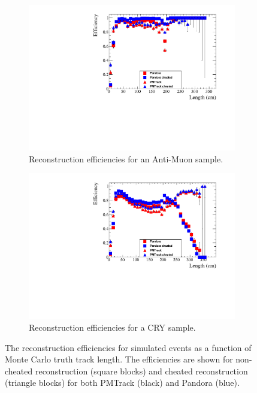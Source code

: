 \begin{figure}[h!]
  \centering
  \begin{subfigure}{0.45\textwidth}
    \centering
    \includegraphics[width=\textwidth]{Effic_AntiMuon_500V_All_Length}
    \caption{Reconstruction efficiencies for an Anti-Muon sample.}
    \label{fig:SimEffic_Length_AMu}
  \end{subfigure}
  \hspace{0.08\textwidth}
  \begin{subfigure}{0.45\textwidth}
    \centering
    \includegraphics[width=\textwidth]{Effic_Cosmics_500V_All_Length}
    \caption{Reconstruction efficiencies for a CRY sample.}
    \label{fig:SimEffic_Length_CRY}
  \end{subfigure}
  \caption[The reconstruction efficiencies for simulated events as a function of Monte Carlo truth track length.]
          {The reconstruction efficiencies for simulated events as a function of Monte Carlo truth track length. The efficiencies are shown for non-cheated reconstruction (square blocks) and cheated reconstruction (triangle blocks) for both PMTrack (black) and Pandora (blue).}
          \label{fig:SimEffic_Length}
\end{figure}

